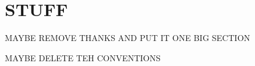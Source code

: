\section{STUFF}

MAYBE REMOVE THANKS AND PUT IT ONE BIG SECTION

MAYBE DELETE TEH CONVENTIONS







